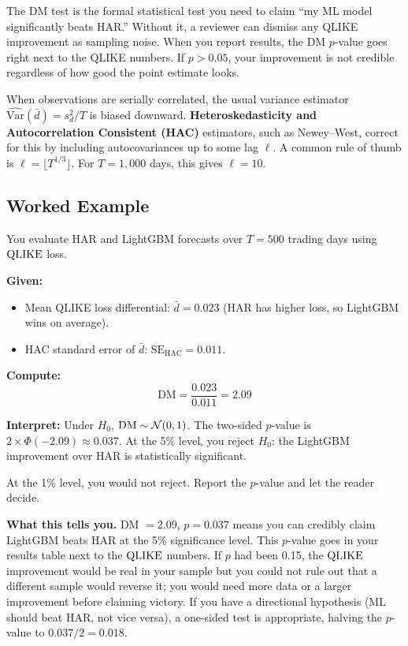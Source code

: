\begin{projectconnection}
The DM test is the formal statistical test you need to claim ``my ML model significantly beats HAR.''
Without it, a reviewer can dismiss any QLIKE improvement as sampling noise.
When you report results, the DM $p$-value goes right next to the QLIKE numbers.
If $p > 0.05$, your improvement is not credible regardless of how good the point estimate looks.
\end{projectconnection}

\begin{prereq}
When observations are serially correlated, the usual variance estimator $\widehat{\text{Var}}(\bar{d}) = s^2_d / T$ is biased downward.
\textbf{Heteroskedasticity and Autocorrelation Consistent (HAC)} estimators, such as Newey--West, correct for this by including autocovariances up to some lag $\ell$.
A common rule of thumb is $\ell = \lfloor T^{1/3} \rfloor$.
For $T = 1{,}000$ days, this gives $\ell = 10$.
\end{prereq}

\subsection{Worked Example}

\begin{workedexample}
You evaluate HAR and LightGBM forecasts over $T = 500$ trading days using $\operatorname{QLIKE}$ loss.

\textbf{Given:}
\begin{itemize}[nosep]
  \item Mean QLIKE loss differential: $\bar{d} = 0.023$ (HAR has higher loss, so LightGBM wins on average).
  \item HAC standard error of $\bar{d}$: $\text{SE}_{\text{HAC}} = 0.011$.
\end{itemize}

\textbf{Compute:}
\[
\text{DM} = \frac{0.023}{0.011} = 2.09
\]

\textbf{Interpret:}
Under $H_0$, $\text{DM} \sim \mathcal{N}(0,1)$.
The two-sided $p$-value is $2 \times \Phi(-2.09) \approx 0.037$.
At the 5\% level, you reject $H_0$: the LightGBM improvement over HAR is statistically significant.

At the 1\% level, you would not reject.
Report the $p$-value and let the reader decide.

\textbf{What this tells you.}
DM $= 2.09$, $p = 0.037$ means you can credibly claim LightGBM beats HAR at the 5\% significance level.
This $p$-value goes in your results table next to the $\operatorname{QLIKE}$ numbers.
If $p$ had been 0.15, the $\operatorname{QLIKE}$ improvement would be real in your sample but you could not rule out that a different sample would reverse it; you would need more data or a larger improvement before claiming victory.
If you have a directional hypothesis (ML should beat HAR, not vice versa), a one-sided test is appropriate, halving the $p$-value to $0.037/2 = 0.018$.
\end{workedexample}

